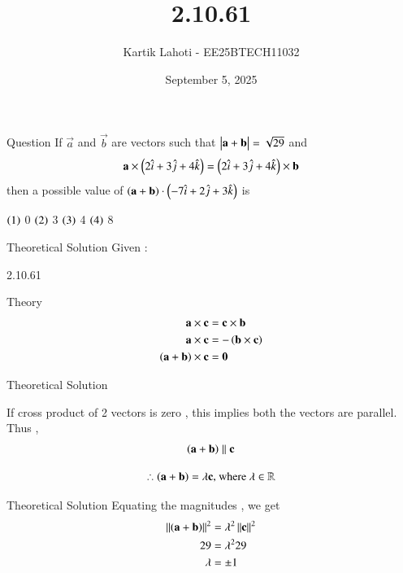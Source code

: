 \documentclass{beamer}
\title %
{2.10.61}
\date{September 5, 2025}
\author 
{Kartik Lahoti - EE25BTECH11032}
\begin{document}
\frame{\titlepage}
\begin{frame}{Question}
If $\vec{a}$ and $\vec{b}$ are vectors such that $\begin{vmatrix}\mathbf{a} + \mathbf{b}\end{vmatrix} = \sqrt{29}$ and
\begin{align*}
    \mathbf{a} \times \left(2\hat{i} + 3\hat{j} + 4\hat{k}\right) = \left(2\hat{i} + 3\hat{j} + 4\hat{k}\right) \times \mathbf{b}
\end{align*}
then a possible value of $\left(\mathbf{a}+\mathbf{b}\right)\cdot\left(-7\hat{i} + 2\hat{j} + 3\hat{k}\right)$ is 


  $\left(1\right)$ 0 \hspace{2cm} $\left(2\right)$ 3 \hspace{2cm} $\left(3\right)$ 4 \hspace{2cm} $\left(4\right)$ 8
\end{frame}



\begin{frame}{Theoretical Solution}
Given :
\begin{table}[H]
    \centering
    
    \caption{2.10.61}
    \label{tab:placeholder_1}
\end{table}
\end{frame}

\begin{frame}{Theory}
\begin{align}
    \mathbf{a} \times \mathbf{c} &= \mathbf{c} \times \mathbf{b}\\
    \mathbf{a} \times \mathbf{c} &= - \left(\mathbf{b} \times \mathbf{c}\right) \\
    \left(\mathbf{a} + \mathbf{b}\right) \times \mathbf{c} &= \mathbf{0}  
\end{align}
\end{frame}
\begin{frame}{Theoretical Solution}

If cross product of 2 vectors is zero ,  this implies both the vectors are parallel. 
Thus , 
\begin{align}
    \left(\mathbf{a} + \mathbf{b}\right) \parallel \mathbf{c} 
\end{align}

\begin{align}
   \therefore\left(\mathbf{a} + \mathbf{b}\right) = \lambda\mathbf{c}  \text{, where } \lambda \in \mathbb{R}
\end{align}

\end{frame}

\begin{frame}{Theoretical Solution}
Equating the magnitudes , we get 
\begin{align}
  \left\lVert\left(\mathbf{a} + \mathbf{b}\right)\right\rVert^2 &= \lambda^2 \left\lVert\mathbf{c}\right\rVert^2 \\
    29 &= \lambda^2 29 \\ 
    \lambda &= \pm 1 
 \end{align}
\end{frame}
\end{document}
